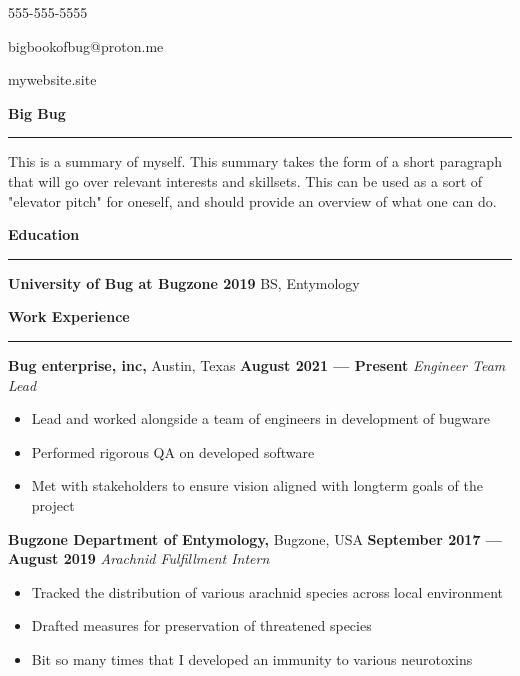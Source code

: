\documentclass[a4paper, 12pt]{article}
\begin{document}
\begin{flushright}
{\fontsize{12pt}{12pt}\selectfont
\item 555-555-5555
\item bigbookofbug@proton.me
\item mywebsite.site
}\end{flushright}
\vspace{-40pt}
\begin{flushleft}
{\fontsize{16pt}{16pt}\selectfont
{\textbf{Big Bug}}}
\noindent\rule{\textwidth}{0.4pt}
\end{flushleft}
\begin{flushleft}
{\fontsize{12pt}{12pt}\selectfont
This is a summary of myself. This summary takes the form of a short paragraph that will go over relevant interests and skillsets. This can be used as a sort of "elevator pitch" for oneself, and should provide an overview of what one can do.}
\newline
\end{flushleft}
\begin{flushleft}
{\fontsize{12pt}{12pt}\selectfont
\textbf{Education}}
\noindent\rule{\textwidth}{0.4pt}
\end{flushleft}
\begin{flushleft}
{\textbf{University of Bug at Bugzone \hfill 2019}}
\newline
BS, Entymology\end{flushleft}
\begin{flushleft}
{\fontsize{12pt}{12pt}\selectfont \textbf{Work Experience}}
\noindent\rule{\textwidth}{0.4pt}
\end{flushleft}
\begin{flushleft}
{\textbf{Bug enterprise, inc,} Austin, Texas \hfill 
\textbf{August 2021 --- Present}}
\newline
\textit{Engineer Team Lead}
\begin{itemize}
\item Lead and worked alongside a team of engineers in development of bugware
\item Performed rigorous QA on developed software
\item Met with stakeholders to ensure vision aligned with longterm goals of the project
\end{itemize}
\end{flushleft}
\begin{flushleft}
{\textbf{Bugzone Department of Entymology,} Bugzone, USA \hfill 
\textbf{September 2017 --- August 2019}}
\newline
\textit{Arachnid Fulfillment Intern}
\begin{itemize}
\item Tracked the distribution of various arachnid species across local environment
\item Drafted measures for preservation of threatened species
\item Bit so many times that I developed an immunity to various neurotoxins
\end{itemize}
\end{flushleft}
\end{document}
